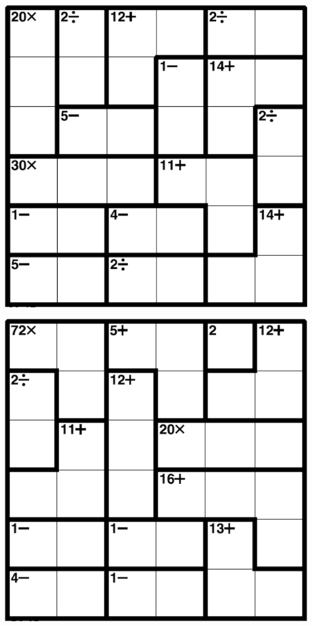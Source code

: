 
\includegraphics[scale=1]{Gambar/Lampiran/6x6_37.png}

\includegraphics[scale=1]{Gambar/Lampiran/6x6_38.png}
